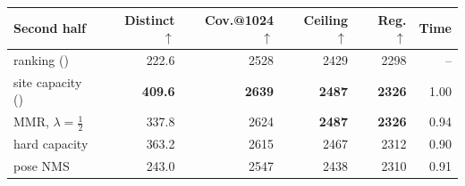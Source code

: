 \begin{tabular}{lrrrrr}
\toprule
Second half & Distinct $\uparrow$ & Cov.@1024 $\uparrow$ & Ceiling $\uparrow$ & Reg. $\uparrow$ & Time \\
\midrule
ranking (\ngr{}) & 222.6 & 2528 & 2429 & 2298 & -- \\
site capacity (\ls{}) & \textbf{409.6} & \textbf{2639} & \textbf{2487} & \textbf{2326} & 1.00 \\
MMR, $\lambda=\frac12$ & 337.8 & 2624 & \textbf{2487} & \textbf{2326} & 0.94 \\
hard capacity & 363.2 & 2615 & 2467 & 2312 & 0.90 \\
pose NMS & 243.0 & 2547 & 2438 & 2310 & 0.91 \\
\bottomrule
\end{tabular}
